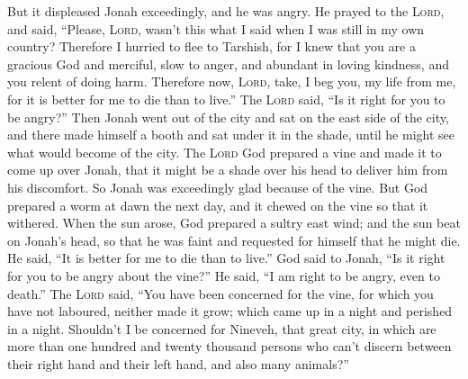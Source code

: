  But it displeased Jonah exceedingly, and he was angry.
 He prayed to the \textsc{Lord}, and said, ``Please,
\textsc{Lord}, wasn't this what I said when I was still in my own
country? Therefore I hurried to flee to Tarshish, for I knew that you
are a gracious God and merciful, slow to anger, and abundant in loving
kindness, and you relent of doing harm.  Therefore now,
\textsc{Lord}, take, I beg you, my life from me, for it is better for me
to die than to live.''  The \textsc{Lord} said, ``Is it
right for you to be angry?''  Then Jonah went out of the
city and sat on the east side of the city, and there made himself a
booth and sat under it in the shade, until he might see what would
become of the city.  The \textsc{Lord} God prepared a vine
and made it to come up over Jonah, that it might be a shade over his
head to deliver him from his discomfort. So Jonah was exceedingly glad
because of the vine.  But God prepared a worm at dawn the
next day, and it chewed on the vine so that it withered. 
When the sun arose, God prepared a sultry east wind; and the sun beat on
Jonah's head, so that he was faint and requested for himself that he
might die. He said, ``It is better for me to die than to live.''
 God said to Jonah, ``Is it right for you to be angry
about the vine?'' He said, ``I am right to be angry, even to death.''
 The \textsc{Lord} said, ``You have been concerned for
the vine, for which you have not laboured, neither made it grow; which
came up in a night and perished in a night.  Shouldn't I
be concerned for Nineveh, that great city, in which are more than one
hundred and twenty thousand persons who can't discern between their
right hand and their left hand, and also many animals?''
